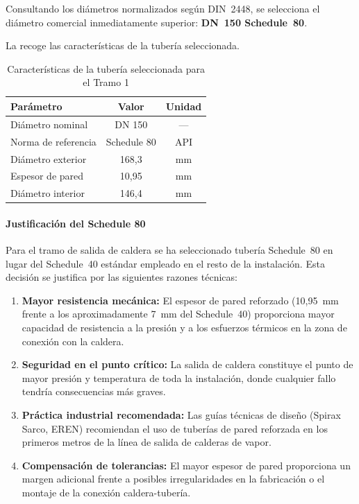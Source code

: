 \documentclass[12pt]{article}
\begin{document}
Consultando los diámetros normalizados según DIN~2448, se selecciona el diámetro comercial inmediatamente superior: \textbf{DN~150 Schedule~80}.

La  recoge las características de la tubería seleccionada.

\begin{table}[H]
	\centering
	\caption{Características de la tubería seleccionada para el Tramo 1}
	\label{tab:seleccion-tuberia-tramo1}
	\begin{tabular}{lcc}
		\toprule
		\textbf{Parámetro}  & \textbf{Valor} & \textbf{Unidad} \\
		\midrule
		Diámetro nominal    & DN 150         & ---             \\
		Norma de referencia & Schedule 80    & API             \\
		Diámetro exterior   & 168,3          & mm              \\
		Espesor de pared    & 10,95          & mm              \\
		Diámetro interior   & 146,4          & mm              \\
		\bottomrule
	\end{tabular}
\end{table}

\paragraph{Justificación del Schedule 80}

Para el tramo de salida de caldera se ha seleccionado tubería Schedule~80 en lugar del Schedule~40 estándar empleado en el resto de la instalación. Esta decisión se justifica por las siguientes razones técnicas:

\begin{enumerate}[label=\arabic*., leftmargin=2em]
	\item \textbf{Mayor resistencia mecánica:} El espesor de pared reforzado (10,95~mm frente a los aproximadamente 7~mm del Schedule~40) proporciona mayor capacidad de resistencia a la presión y a los esfuerzos térmicos en la zona de conexión con la caldera.
	\item \textbf{Seguridad en el punto crítico:} La salida de caldera constituye el punto de mayor presión y temperatura de toda la instalación, donde cualquier fallo tendría consecuencias más graves.
	\item \textbf{Práctica industrial recomendada:} Las guías técnicas de diseño (Spirax Sarco, EREN) recomiendan el uso de tuberías de pared reforzada en los primeros metros de la línea de salida de calderas de vapor.
	\item \textbf{Compensación de tolerancias:} El mayor espesor de pared proporciona un margen adicional frente a posibles irregularidades en la fabricación o el montaje de la conexión caldera-tubería.
\end{enumerate}
\end{document}
